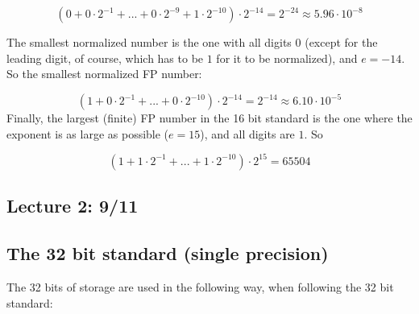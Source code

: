 \documentclass[]{book}
\theoremstyle{definition}
\theoremstyle{definition}
\theoremstyle{definition}
\theoremstyle{remark}
\begin{document}
\[
\left(0 + 0\cdot 2^{-1} + ... + 0\cdot 2^{-9} + 1\cdot 2^{-10}\right)\cdot 2^{-14} = 2^{-24} \approx 5.96\cdot 10^{-8}
\]

The smallest normalized number is the one with all digits \(0\) (except
for the leading digit, of course, which has to be \(1\) for it to be
normalized), and \(e = -14\). So the smallest normalized FP number:

\[
\left(1 + 0\cdot 2^{-1} + ... + 0\cdot 2^{-10}\right)\cdot 2^{-14} = 2^{-14} \approx 6.10\cdot 10^{-5}
\] Finally, the largest (finite) FP number in the 16 bit standard is the
one where the exponent is as large as possible (\(e = 15\)), and all
digits are \(1\). So

\[
\left(1 + 1\cdot 2^{-1} + ... + 1\cdot 2^{-10}\right)\cdot 2^{15} = 65504
\]

\subsection*{Lecture 2: 9/11}\label{lecture-2-911}

\subsection{The 32 bit standard (single
precision)}\label{the-32-bit-standard-single-precision}

The 32 bits of storage are used in the following way, when following the
32 bit standard:
\end{document}
